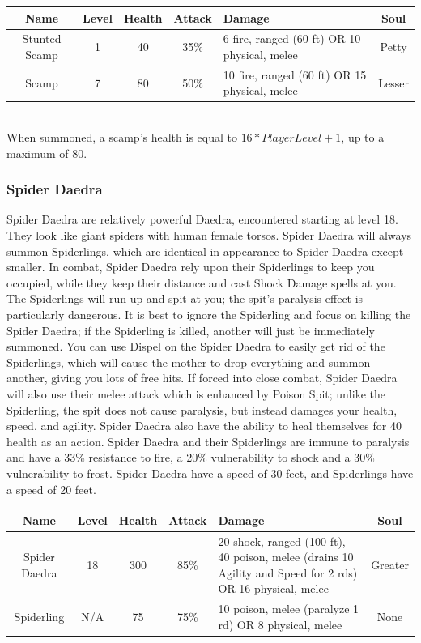 \documentclass[12pt]{book}
\begin{document}
\begin{tabular}{|c|c|c|c|p{}|c|}
\hline
Name & Level & Health & Attack & Damage & Soul\\ \hline
Stunted Scamp & 1 & 40 & 35\% & 6 fire, ranged (60 ft) OR 10 physical, melee & Petty\\ \hline
Scamp & 7 & 80 & 50\% & 10 fire, ranged (60 ft) OR 15 physical, melee & Lesser\\ \hline
\end{tabular}\\

When summoned, a scamp's health is equal to $16*PlayerLevel+1$, up to a maximum of 80.

\subsubsection{Spider Daedra}
Spider Daedra are relatively powerful Daedra, encountered starting at level 18. They look like giant spiders with human female torsos. Spider Daedra will always summon Spiderlings, which are identical in appearance to Spider Daedra except smaller. In combat, Spider Daedra rely upon their Spiderlings to keep you occupied, while they keep their distance and cast Shock Damage spells at you. The Spiderlings will run up and spit at you; the spit's paralysis effect is particularly dangerous. It is best to ignore the Spiderling and focus on killing the Spider Daedra; if the Spiderling is killed, another will just be immediately summoned. You can use Dispel on the Spider Daedra to easily get rid of the Spiderlings, which will cause the mother to drop everything and summon another, giving you lots of free hits. If forced into close combat, Spider Daedra will also use their melee attack which is enhanced by Poison Spit; unlike the Spiderling, the spit does not cause paralysis, but instead damages your health, speed, and agility. Spider Daedra also have the ability to heal themselves for 40 health as an action. Spider Daedra and their Spiderlings are immune to paralysis and have a 33\% resistance to fire, a 20\% vulnerability to shock and a 30\% vulnerability to frost. Spider Daedra have a speed of 30 feet, and Spiderlings have a speed of 20 feet.

\begin{tabular}{|c|c|c|c|p{}|c|}
\hline
Name & Level & Health & Attack & Damage & Soul\\ \hline
Spider Daedra & 18 & 300 & 85\% & 20 shock, ranged (100 ft), 40 poison, melee (drains 10 Agility and Speed for 2 rds) OR 16 physical, melee & Greater\\ \hline
Spiderling & N/A & 75 & 75\% & 10 poison, melee (paralyze 1 rd) OR 8 physical, melee & None\\ \hline
\end{tabular}\\
\end{document}
